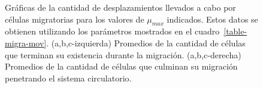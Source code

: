 \begin{figure}[p]
\begin{center}
{}\vspace*{-0.25cm}
\vspace*{-0.25cm}
\end{center}\vspace*{-0.6cm}
\caption[Gr\'aficas de la cantidad de desplazamientos llevados a cabo por c\'elulas migratorias]{Gr\'aficas de la cantidad de desplazamientos llevados a cabo por c\'elulas migratorias para los valores de $\mu_{max}$ indicados. Estos datos se obtienen utilizando los par\'ametros mostrados en el cuadro~\ref{table-migra-mov}. (a,b,c-izquierda) Promedios de la cantidad de c\'elulas que terminan su existencia durante la migraci\'on. (a,b,c-derecha) Promedios de la cantidad de c\'elulas que culminan su migraci\'on penetrando el sistema circulatorio.}
\label{graph-migra-mov}
\end{figure}

